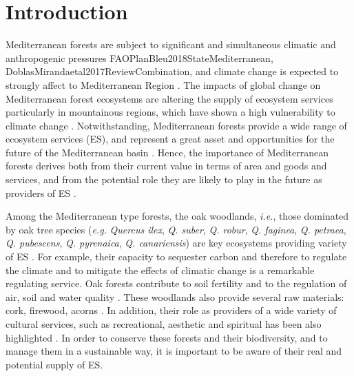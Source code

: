 \newpage

\section{Introduction}\label{sec:es:intro}

Mediterranean forests are subject to significant and simultaneous climatic and anthropogenic pressures {FAOPlanBleu2018StateMediterranean, DoblasMirandaetal2017ReviewCombination}, and climate change is expected to strongly affect to Mediterranean Region \autocite{GiorgiLionello2008ClimateChange, Penuelasetal2017ImpactsGlobal,Crameretal2018ClimateChange,Crameretal2020ClimateEnvironmental}. The impacts of global change on Mediterranean forest ecosystems are altering the supply of ecosystem services \autocite{Lindneretal2010ClimateChange,Lindneretal2014ClimateChange,NoceSantini2018MediterraneanForest,Penuelasetal2017ImpactsGlobal,SerradaHierroetal2011ImpactosVulnerabilidad} particularly in mountainous regions, which have shown a high vulnerability to climate change \autocite{Schroteretal2005EcosystemService}. Notwithstanding, Mediterranean forests provide a wide range of ecosystem services (ES), and represent a great asset and opportunities for the future of the Mediterranean basin \autocite{Gauquelinetal2018MediterraneanForests, NoceSantini2018MediterraneanForest}. Hence, the importance of Mediterranean forests derives both from their current value in terms of area and goods and services, and from the potential role they are likely to play in the future as providers of ES \autocites{FAOPlanBleu2018StateMediterranean}.

Among the Mediterranean type forests, the oak woodlands, \emph{i.e.}, those dominated by oak tree species (\emph{e.g.} \emph{Quercus ilex}, \emph{Q. suber}, \emph{Q. robur}, \emph{Q. faginea}, \emph{Q. petraea}, \emph{Q. pubescens}, \emph{Q. pyrenaica}, \emph{Q. canariensis}) are key ecosystems providing variety of ES \autocite{Maranonetal2020IberianOaks}. For example, their capacity to sequester carbon and therefore to regulate the climate and to mitigate the effects of climatic change is a remarkable regulating service. Oak forests contribute to soil fertility and to the regulation of air, soil and water quality \autocite{Maranonetal2012EstadoTendencia}. These woodlands also provide several raw materials: cork, firewood, acorns \autocite{Bugalhoetal2011MediterraneanCork}. In addition, their role as providers of a wide variety of cultural services, such as recreational, aesthetic and spiritual has been also highlighted \autocite{Lofetal2016ManagementOak}. In order to conserve these forests and their biodiversity, and to manage them in a sustainable way, it is important to be aware of their real and potential supply of ES.

